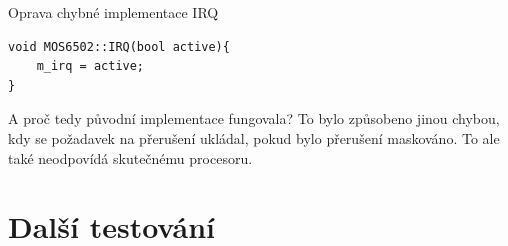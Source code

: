 \begin{listing}
	\caption{Oprava chybné implementace IRQ}
	\label{list:6502-preruseni-irq-oprava}
	\begin{verbatim}
void MOS6502::IRQ(bool active){
	m_irq = active;
}
	\end{verbatim}
\end{listing}


\begin{note}
A proč tedy původní implementace fungovala? To bylo způsobeno jinou chybou, kdy se požadavek na přerušení ukládal, pokud bylo přerušení maskováno. To ale také neodpovídá skutečnému procesoru.
\end{note}

\section{Další testování}